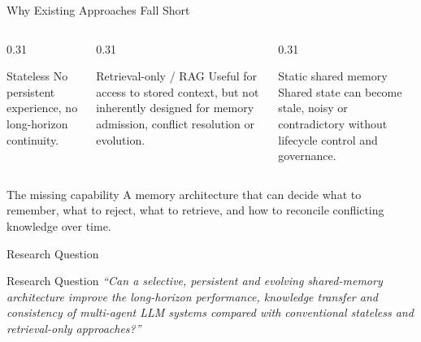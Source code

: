\begin{frame}{Why Existing Approaches Fall Short}
\begin{columns}[T,onlytextwidth]
\begin{column}{0.31\textwidth}
\begin{block}{Stateless}
No persistent experience, no long-horizon continuity.
\end{block}
\end{column}
\begin{column}{0.31\textwidth}
\begin{block}{Retrieval-only / RAG}
Useful for access to stored context, but not inherently designed for memory admission, conflict resolution or evolution.
\end{block}
\end{column}
\begin{column}{0.31\textwidth}
\begin{block}{Static shared memory}
Shared state can become stale, noisy or contradictory without lifecycle control and governance.
\end{block}
\end{column}
\end{columns}
\vspace{3mm}
\begin{block}{The missing capability}
A memory architecture that can decide what to remember, what to reject, what to retrieve, and how to reconcile conflicting knowledge over time.
\end{block}
\end{frame}

\begin{frame}{Research Question}
\begin{alertblock}{Research Question}
\emph{``Can a selective, persistent and evolving shared-memory architecture improve the long-horizon performance, knowledge transfer and consistency of multi-agent LLM systems compared with conventional stateless and retrieval-only approaches?''}
\end{alertblock}
\end{frame}

